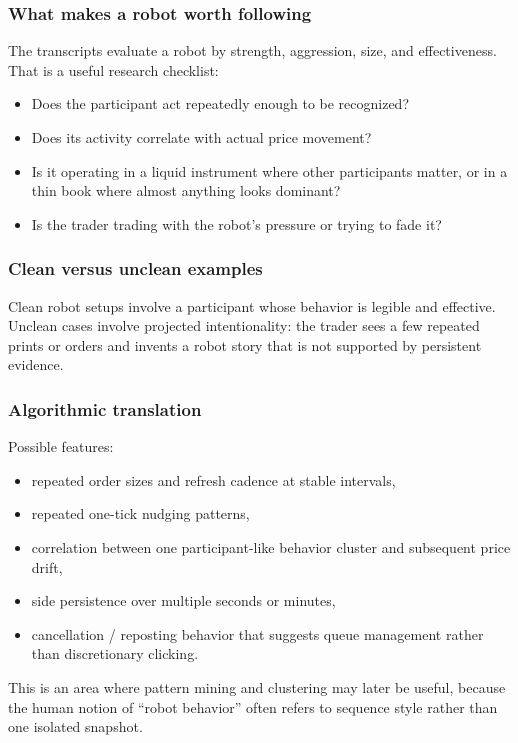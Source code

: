 \subsubsection{What makes a robot worth following}

The transcripts evaluate a robot by strength, aggression, size, and effectiveness. That is a
useful research checklist:

\begin{itemize}[leftmargin=1.4em]
  \item Does the participant act repeatedly enough to be recognized?
  \item Does its activity correlate with actual price movement?
  \item Is it operating in a liquid instrument where other participants matter, or in a thin
        book where almost anything looks dominant?
  \item Is the trader trading with the robot's pressure or trying to fade it?
\end{itemize}

\subsubsection{Clean versus unclean examples}

Clean robot setups involve a participant whose behavior is legible and effective. Unclean cases
involve projected intentionality: the trader sees a few repeated prints or orders and invents a
robot story that is not supported by persistent evidence.

\subsubsection{Algorithmic translation}

Possible features:

\begin{itemize}[leftmargin=1.4em]
  \item repeated order sizes and refresh cadence at stable intervals,
  \item repeated one-tick nudging patterns,
  \item correlation between one participant-like behavior cluster and subsequent price drift,
  \item side persistence over multiple seconds or minutes,
  \item cancellation / reposting behavior that suggests queue management rather than discretionary
        clicking.
\end{itemize}

This is an area where pattern mining and clustering may later be useful, because the human
notion of ``robot behavior'' often refers to sequence style rather than one isolated snapshot.
